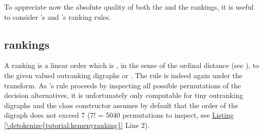 \documentclass[a4paper,12pt,english]{sphinxhowto}
\begin{document}
To appreciate now the absolute quality of both the  and the  rankings, it is useful to consider ’s and ’s  ranking rules.


\subsection{ rankings}
\label{\detokenize{tutorial:kemeny-rankings}}
A  ranking is a linear order which is , in the sense of the ordinal  distance (see ), to the given valued outranking digraphs  or . The rule is indeed again  under the  transform. As ’s rule proceeds by inspecting all possible permutations of the decision alternatives, it is unfortunately only computable for tiny outranking digraphs and the class constructor assumes by default that the order of the digraph does not exceed 7 (7! = 5040 permutations to inspect, see \hyperref[\detokenize{tutorial:kemenyranking}]{Listing \ref{\detokenize{tutorial:kemenyranking}}} Line 2).
\def\sphinxLiteralBlockLabel{\label{\detokenize{tutorial:kemenyranking}}}
\begin{sphinxVerbatim}[commandchars=\\\{\},numbers=left,firstnumber=1,stepnumber=1]
   
   
  
\end{sphinxVerbatim}
\end{document}
